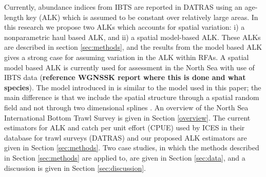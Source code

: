 \documentclass[a4paper 12pt]{article}
\numberwithin{equation}{section}
\begin{document}
Currently, abundance indices from IBTS are reported in DATRAS \citep{datras} using an age-length key (ALK) \citep{fridriksson1934calculation} which is assumed to be constant over relatively large areas. In this research we propose two ALKs which accounts for spatial variation: i) a nonparametric  haul based ALK, and ii) a spatial model-based ALK. These ALKs are described in section \ref{sec:methods}, and the results from the model based ALK gives a strong case for assuming variation in the ALK within RFAs. %
A spatial model based ALK \citep{berg2012spatial} is currently used for assessment in the North Sea with use of IBTS data ({\bf reference WGNSSK report where this is done and what species}). The model introduced in \citet{berg2012spatial} is similar to the model used in this paper; the main difference is that we include the spatial structure through a spatial random field \citep{lindgren2011explicit} and not through two dimensional splines \citep{wood2017generalized}.%
 An  overview of the  North Sea International Bottom Trawl Survey is given in Section \ref{overview}. The current estimators for ALK and catch per unit effort (CPUE) used by ICES in their database for trawl surveys (DATRAS) and our proposed ALK estimators are given in Section \ref{sec:methods}. Two case studies, in which the methods described in Section \ref{sec:methods} are applied to, are given in Section \ref{sec:data}, and a discussion is given in Section \ref{sec:discussion}.%
\end{document}
